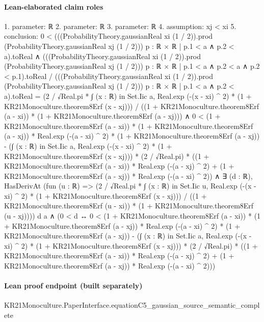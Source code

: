 \documentclass[10pt]{article}
\begin{document}
\paragraph{Lean-elaborated claim roles}\begin{ReviewVerbatim}
1. parameter: ℝ
2. parameter: ℝ
3. parameter: ℝ
4. assumption: xj < xi
5. conclusion: 0 <
    (((ProbabilityTheory.gaussianReal xi (1 / 2)).prod (ProbabilityTheory.gaussianReal xj (1 / 2)))
        {p : ℝ × ℝ | p.1 < a ∧ p.2 < a}).toReal ∧
  (((ProbabilityTheory.gaussianReal xi (1 / 2)).prod (ProbabilityTheory.gaussianReal xj (1 / 2)))
            {p : ℝ × ℝ | p.1 < a ∧ p.2 < a ∧ p.2 < p.1}).toReal /
        (((ProbabilityTheory.gaussianReal xi (1 / 2)).prod (ProbabilityTheory.gaussianReal xj (1 / 2)))
            {p : ℝ × ℝ | p.1 < a ∧ p.2 < a}).toReal =
      (2 / √Real.pi * ∫ (x : ℝ) in Set.Iic a, Real.exp (-(x - xi) ^ 2) * (1 + KR21Monoculture.theorem8Erf (x - xj))) /
        ((1 + KR21Monoculture.theorem8Erf (a - xi)) * (1 + KR21Monoculture.theorem8Erf (a - xj))) ∧
    0 <
        (1 + KR21Monoculture.theorem8Erf (a - xi)) * (1 + KR21Monoculture.theorem8Erf (a - xj)) *
              Real.exp (-(a - xi) ^ 2) *
            (1 + KR21Monoculture.theorem8Erf (a - xj)) -
          (∫ (x : ℝ) in Set.Iic a, Real.exp (-(x - xi) ^ 2) * (1 + KR21Monoculture.theorem8Erf (x - xj))) *
              (2 / √Real.pi) *
            ((1 + KR21Monoculture.theorem8Erf (a - xi)) * Real.exp (-(a - xj) ^ 2) +
              (1 + KR21Monoculture.theorem8Erf (a - xj)) * Real.exp (-(a - xi) ^ 2)) ∧
      ∃ (d : ℝ),
        HasDerivAt
            (fun (u : ℝ) =>
              (2 / √Real.pi *
                  ∫ (x : ℝ) in Set.Iic u, Real.exp (-(x - xi) ^ 2) * (1 + KR21Monoculture.theorem8Erf (x - xj))) /
                ((1 + KR21Monoculture.theorem8Erf (u - xi)) * (1 + KR21Monoculture.theorem8Erf (u - xj))))
            d a ∧
          (0 < d ↔
            0 <
              (1 + KR21Monoculture.theorem8Erf (a - xi)) * (1 + KR21Monoculture.theorem8Erf (a - xj)) *
                    Real.exp (-(a - xi) ^ 2) *
                  (1 + KR21Monoculture.theorem8Erf (a - xj)) -
                (∫ (x : ℝ) in Set.Iic a, Real.exp (-(x - xi) ^ 2) * (1 + KR21Monoculture.theorem8Erf (x - xj))) *
                    (2 / √Real.pi) *
                  ((1 + KR21Monoculture.theorem8Erf (a - xi)) * Real.exp (-(a - xj) ^ 2) +
                    (1 + KR21Monoculture.theorem8Erf (a - xj)) * Real.exp (-(a - xi) ^ 2)))
\end{ReviewVerbatim}

\paragraph{Lean proof endpoint (built separately)}\begin{ReviewVerbatim}
KR21Monoculture.PaperInterface.equationC5_gaussian_source_semantic_complete
\end{ReviewVerbatim}
\end{document}
